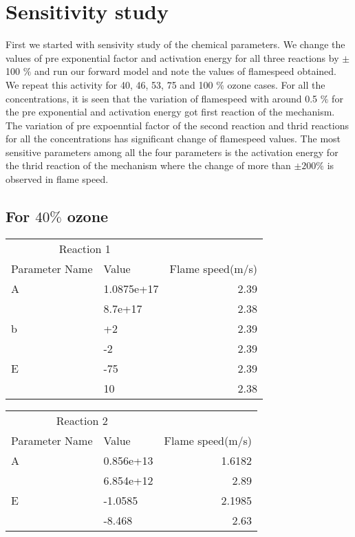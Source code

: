 \section{Sensitivity study}

 First we started with sensivity study of the chemical parameters. We
 change the values of pre exponential factor and activation energy for
 all three reactions by $\pm$ 100 $\% $ and run our forward model and
 note the values of flamespeed obtained. We repeat this activity for
 40, 46, 53, 75 and 100 $\%$ ozone cases. For all the concentrations,
 it is seen that the variation of flamespeed with around 0.5 $\%$ for
 the pre exponential and activation energy got first reaction of the
 mechanism. The variation of pre expoenntial factor of the second
 reaction and thrid reactions for all the concentrations has
 significant change of flamespeed values. The most sensitive
 parameters among all the four parameters is the activation energy for
 the thrid reaction of the mechanism where the change of more than
 $\pm 200\%$ is observed in flame speed.


 \subsection{For $40\%$ ozone}
   \begin{tabular}{llr}  
    \toprule
    \multicolumn{2}{c}{Reaction 1} \\
    \cmidrule(r){1-2}
    Parameter Name  & Value &  Flame speed(m/s)\\
    \midrule
    A      & 1.0875e+17    & 2.39      \\
           &  8.7e+17     & 2.38       \\
    b      & +2    & 2.39      \\
           &    -2     & 2.39         \\
    E      & -75    & 2.39      \\
           &   10     & 2.38       \\
    
    \bottomrule
  \end{tabular}
  
   \begin{tabular}{llr}  
    \toprule
    \multicolumn{2}{c}{Reaction 2} \\
    \cmidrule(r){1-2}
    Parameter Name  & Value &  Flame speed(m/s)\\
    \midrule
    A      & 0.856e+13    & 1.6182      \\
           &  6.854e+12     & 2.89       \\
   
    E      & -1.0585    & 2.1985      \\
           &   -8.468     & 2.63       \\
    
    \bottomrule
  \end{tabular}
  
